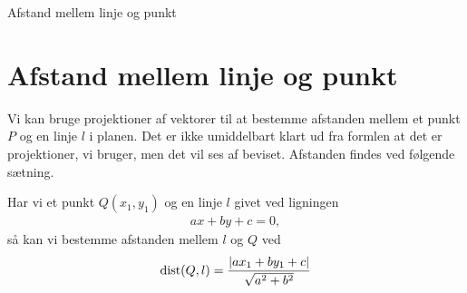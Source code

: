 
\begin{center}
\Huge
Afstand mellem linje og punkt
\end{center}

\section*{Afstand mellem linje og punkt}

Vi kan bruge projektioner af vektorer til at bestemme afstanden mellem et punkt $P$ og en linje $l$ i planen. Det er ikke umiddelbart klart ud fra formlen at det er projektioner, vi bruger, men det vil ses af beviset. Afstanden findes ved følgende sætning. 

\begin{setn}
Har vi et punkt $Q(x_1,y_1)$ og en linje $l$ givet ved ligningen
\begin{align*}
ax+by+c = 0, 
\end{align*}
så kan vi bestemme afstanden mellem $l$ og $Q$ ved
\begin{align*}
\textnormal{dist}(Q,l) = \frac{|ax_1+by_1+c|}{\sqrt{a^2+b^2}}
\end{align*}
\end{setn}
